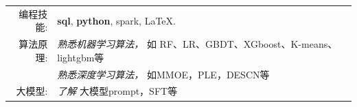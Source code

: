 %
%


 
\renewcommand{\arraystretch}{1.1}

	\begin{tabular}{>{}r>{}p{13cm}} 
		\textsc{编程技能:}      &  \textbf{sql}, \textbf{python}, spark, LaTeX.\\  
		\textsc{算法原理:} 		&  \emph{熟悉机器学习算法，} 如 RF、LR、GBDT、XGboost、K-means、lightgbm等 \\
							   &  \emph{熟悉深度学习算法，}  如MMOE，PLE，DESCN等 \\
		\textsc{大模型:}	   &  \emph{了解}  大模型prompt，SFT等  \\
	\end{tabular}
	
